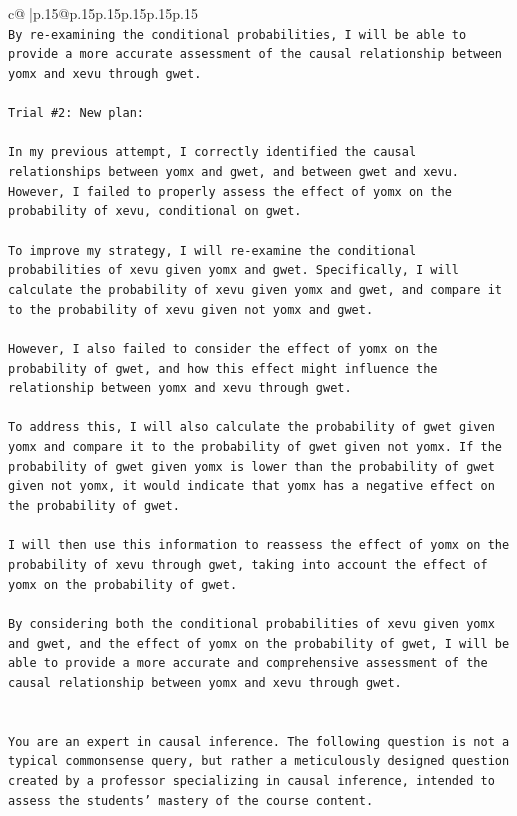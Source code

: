 \documentclass{article}
\begin{document}
{\begin{supertabular}{c@{$\;$}|p{.15\linewidth}@{}p{.15\linewidth}p{.15\linewidth}p{.15\linewidth}p{.15\linewidth}p{.15\linewidth}}
{{{\\ 
\texttt{By re{-}examining the conditional probabilities, I will be able to provide a more accurate assessment of the causal relationship between yomx and xevu through gwet.} \\
\\ 
\texttt{Trial \#2: New plan: } \\
\\ 
\texttt{In my previous attempt, I correctly identified the causal relationships between yomx and gwet, and between gwet and xevu. However, I failed to properly assess the effect of yomx on the probability of xevu, conditional on gwet. } \\
\\ 
\texttt{To improve my strategy, I will re{-}examine the conditional probabilities of xevu given yomx and gwet. Specifically, I will calculate the probability of xevu given yomx and gwet, and compare it to the probability of xevu given not yomx and gwet. } \\
\\ 
\texttt{However, I also failed to consider the effect of yomx on the probability of gwet, and how this effect might influence the relationship between yomx and xevu through gwet. } \\
\\ 
\texttt{To address this, I will also calculate the probability of gwet given yomx and compare it to the probability of gwet given not yomx. If the probability of gwet given yomx is lower than the probability of gwet given not yomx, it would indicate that yomx has a negative effect on the probability of gwet. } \\
\\ 
\texttt{I will then use this information to reassess the effect of yomx on the probability of xevu through gwet, taking into account the effect of yomx on the probability of gwet. } \\
\\ 
\texttt{By considering both the conditional probabilities of xevu given yomx and gwet, and the effect of yomx on the probability of gwet, I will be able to provide a more accurate and comprehensive assessment of the causal relationship between yomx and xevu through gwet.} \\
\\ 
\\ 
\texttt{You are an expert in causal inference. The following question is not a typical commonsense query, but rather a meticulously designed question created by a professor specializing in causal inference, intended to assess the students' mastery of the course content.} \\
}}}
\end{supertabular}}
\end{document}
